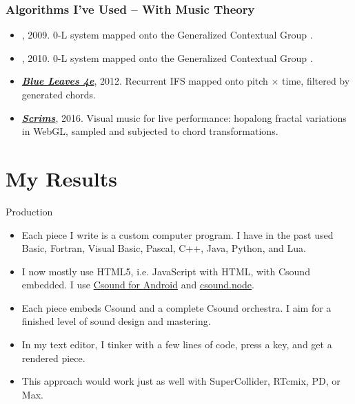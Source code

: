 \documentclass{beamer}
\begin{document}
\begin{frame}[allowframebreaks]
    \frametitle<presentation>{Algorithms I've Used -- With Music Theory}
    \begin{itemize}
        \item
        , 2009. 0-L system mapped onto the Generalized Contextual Group \cite{G2006}.
        \item
        , 2010. 0-L system mapped onto the Generalized Contextual Group \cite{G2006}.
        \item
        \href{http://soundcloud.com/michael-gogins/blue-leaves-4e}{\textit{\textbf{Blue Leaves 4e}}}, 2012. Recurrent IFS mapped onto pitch $\times$ time, filtered by generated chords.
        \item
        \href{https://gogins.github.io/csound/Scrims_pnacl.html}{\textit{\textbf{Scrims}}}, 2016. Visual music for live performance: hopalong fractal variations in WebGL, sampled and subjected to chord transformations.
    \end{itemize}
\end{frame}

\section{My Results}

\begin{frame}{Production}
	\begin{itemize}
		\item
    		Each piece I write is a custom computer program. I have in the past used Basic, Fortran, Visual Basic, Pascal, C++, Java, Python, and Lua.
		\item 
    		I now mostly use HTML5, i.e. JavaScript with HTML, with Csound embedded. I use \href{https://play.google.com/store/apps/details?id=com.csounds.Csound6&hl=en}{Csound for Android} and \href{https://github.com/csound/csound/tree/develop/frontends/nwjs}{csound.node}.
		\item
    		Each piece embeds Csound and a complete Csound orchestra. 
    		I aim for a finished level of sound design and mastering.
		\item
    		In my text editor, I tinker with a few lines of code, press a key, and get a rendered piece.
		\item
    		This approach would work just as well with SuperCollider, RTcmix, PD, or Max.
	\end{itemize}
\end{frame}
\end{document}
